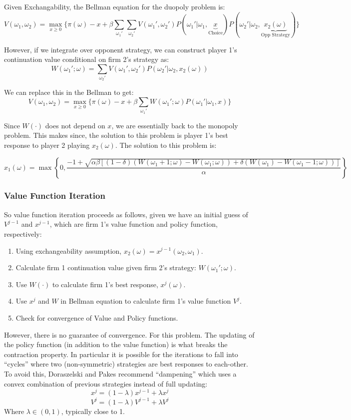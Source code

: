 \documentclass[twoside]{article}
\begin{document}
Given Exchangability, the Bellman equation for the duopoly problem is: 
$$V(\omega_1, \omega_2) = \max_{x \geq 0} \bigg\{ \pi(\omega) - x + \beta \sum_{\omega_1'} \sum_{\omega_2'} V(\omega_1', \omega_2') P(\omega_1'| \omega_1, \underbrace{x}_{\mbox{Choice}}) P(\omega_2'| \omega_2, \underbrace{x_2(\omega)}_{\mbox{Opp Strategy}}) \bigg\}$$

However, if we integrate over opponent strategy, we can construct player 1's continuation value conditional on firm 2's strategy as:  
$$ W(\omega_1'; \omega) = \sum_{\omega_2'} V(\omega_1', \omega_2') P(\omega_2' | \omega_2, x_2(\omega)) $$

We can replace this in the Bellman to get: 
$$V(\omega_1, \omega_2) = \max_{x \geq 0} \bigg\{ \pi(\omega) - x + \beta \sum_{\omega_1'} W(\omega_1'; \omega) P(\omega_1'| \omega_1, x)  \bigg\}$$

Since $W(\cdot)$ does not depend on $x$, we are essentially back to the monopoly problem.  This makes since, the solution to this problem is player 1's 
best response to player 2 playing $x_2(\omega)$.  The solution to this problem is: 

 $$x_1(\omega) =  \max\left\{0, \frac{-1 + \sqrt{\alpha \beta \left[ (1 - \delta) (W(\omega_1 + 1; \omega) - W(\omega_1; \omega)) + \delta(W(\omega_1) -  W(\omega_1 - 1; \omega)) \right] } }{\alpha} \right\} $$

\subsubsection{Value Function Iteration}

So value function iteration proceeds as follows, given we have an initial guess of $V^{j-1}$ and $x^{j-1}$, which are firm 1's value function and policy
function, respectively: 
\begin{enumerate}
\item Using exchangeability assumption, $x_2(\omega) = x^{j-1}(\omega_2, \omega_1)$. 
\item Calculate firm 1 continuation value given firm 2's strategy: $W(\omega_1'; \omega)$. 
\item Use $W(\cdot)$ to calculate firm 1's best response, $x^j(\omega)$.
\item Use $x^j$ and $W$ in Bellman equation to calculate firm 1's value function $V^{j}$. 
\item Check for convergence of Value and Policy functions.
\end{enumerate}

However, there is no guarantee of convergence. For this problem. The updating of the policy function (in addition to the value function) is what
breaks the contraction property. In particular it is possible for the iterations to fall into ``cycles'' where two (non-symmetric) strategies are best responses to each-other. To avoid this, Doraszelski and Pakes recommend ``dampening'' which uses a convex combination of previous strategies instead of full updating: 
$$ x^j = (1-\lambda)x^{j-1} + \lambda x^j $$
$$ V^j = (1- \lambda) V^{j-1} + \lambda V^j$$
Where $\lambda \in (0, 1)$, typically close to 1. 
\end{document}
